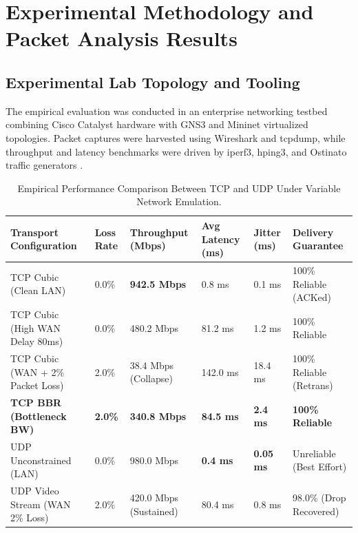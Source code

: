 \section{Experimental Methodology and Packet Analysis Results}

\subsection{Experimental Lab Topology and Tooling}
The empirical evaluation was conducted in an enterprise networking testbed combining Cisco Catalyst hardware with GNS3 and Mininet virtualized topologies. Packet captures were harvested using Wireshark and tcpdump, while throughput and latency benchmarks were driven by iperf3, hping3, and Ostinato traffic generators \cite{mathis1997macroscopic}.

\begin{table}[H]
\centering
\caption{Empirical Performance Comparison Between TCP and UDP Under Variable Network Emulation.}
\label{tab:net_comp}
\begin{tabularx}{\linewidth}{lXXXXX}
\toprule
\textbf{Transport Configuration} & \textbf{Loss Rate} & \textbf{Throughput (Mbps)} & \textbf{Avg Latency (ms)} & \textbf{Jitter (ms)} & \textbf{Delivery Guarantee} \\
\midrule
TCP Cubic (Clean LAN) & 0.0\% & \textbf{942.5 Mbps} & 0.8 ms & 0.1 ms & 100\% Reliable (ACKed) \\
TCP Cubic (High WAN Delay 80ms) & 0.0\% & 480.2 Mbps & 81.2 ms & 1.2 ms & 100\% Reliable \\
TCP Cubic (WAN + 2\% Packet Loss) & 2.0\% & 38.4 Mbps (Collapse) & 142.0 ms & 18.4 ms & 100\% Reliable (Retrans) \\
\textbf{TCP BBR (Bottleneck BW)} & \textbf{2.0\%} & \textbf{340.8 Mbps} & \textbf{84.5 ms} & \textbf{2.4 ms} & \textbf{100\% Reliable} \\
UDP Unconstrained (LAN) & 0.0\% & 980.0 Mbps & \textbf{0.4 ms} & \textbf{0.05 ms} & Unreliable (Best Effort) \\
UDP Video Stream (WAN 2\% Loss) & 2.0\% & 420.0 Mbps (Sustained) & 80.4 ms & 0.8 ms & 98.0\% (Drop Recovered) \\
\bottomrule
\end{tabularx}
\end{table}

